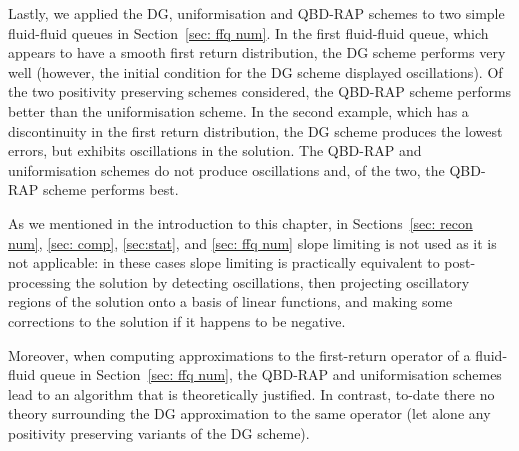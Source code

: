 Lastly, we applied the DG, uniformisation and QBD-RAP schemes to two simple fluid-fluid queues in Section~\ref{sec: ffq num}. In the first fluid-fluid queue, which appears to have a smooth first return distribution, the DG scheme performs very well (however, the initial condition for the DG scheme displayed oscillations). Of the two positivity preserving schemes considered, the QBD-RAP scheme performs better than the uniformisation scheme. In the second example, which has a discontinuity in the first return distribution, the DG scheme produces the lowest errors, but exhibits oscillations in the solution. The QBD-RAP and uniformisation schemes do not produce oscillations and, of the two, the QBD-RAP scheme performs best.

As we mentioned in the introduction to this chapter, in Sections~\ref{sec: recon num}, \ref{sec: comp}, \ref{sec:stat}, and \ref{sec: ffq num} slope limiting is not used as it is not applicable: in these cases slope limiting is practically equivalent to post-processing the solution by detecting oscillations, then projecting oscillatory regions of the solution onto a basis of linear functions, and making some corrections to the solution if it happens to be negative.

Moreover, when computing approximations to the first-return operator of a fluid-fluid queue in Section~\ref{sec: ffq num}, the QBD-RAP and uniformisation schemes lead to an algorithm that is theoretically justified. In contrast, to-date there no theory surrounding the DG approximation to the same operator (let alone any positivity preserving variants of the DG scheme).

